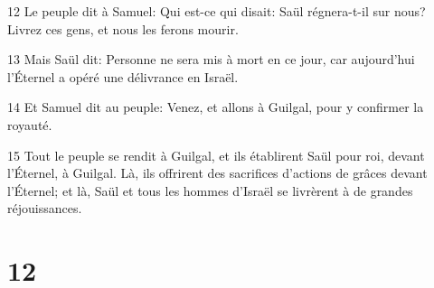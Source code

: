 \par 12 Le peuple dit à Samuel: Qui est-ce qui disait: Saül régnera-t-il sur nous? Livrez ces gens, et nous les ferons mourir.
\par 13 Mais Saül dit: Personne ne sera mis à mort en ce jour, car aujourd'hui l'Éternel a opéré une délivrance en Israël.
\par 14 Et Samuel dit au peuple: Venez, et allons à Guilgal, pour y confirmer la royauté.
\par 15 Tout le peuple se rendit à Guilgal, et ils établirent Saül pour roi, devant l'Éternel, à Guilgal. Là, ils offrirent des sacrifices d'actions de grâces devant l'Éternel; et là, Saül et tous les hommes d'Israël se livrèrent à de grandes réjouissances.

\chapter{12}

